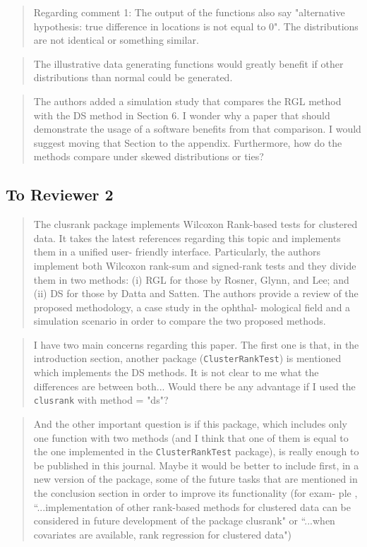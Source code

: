 \documentclass[12pt]{article}
\newenvironment{comment}%
{\begin{quotation}\noindent\small\it\ignorespaces%
  }{\end{quotation}}
\begin{document}
\begin{comment}
Regarding comment 1: The output of the functions also say "alternative
hypothesis: true difference in locations is not equal to 0". The distributions are
not identical or something similar.
\end{comment}

\begin{comment}
The illustrative data generating functions would greatly benefit if other
distributions than normal could be generated.
\end{comment}

\begin{comment}
The authors added a simulation study that compares the RGL method with the
DS method in Section 6. I wonder why a paper that should demonstrate the
usage of a software benefits from that comparison. I would suggest moving
that Section to the appendix. Furthermore, how do the methods compare
under skewed distributions or ties?
\end{comment}


\subsection*{To Reviewer 2}

\begin{comment}
The clusrank package implements Wilcoxon Rank-based tests for clustered
data. It takes the latest references regarding this topic and implements
them in a unified user- friendly interface. Particularly, the authors
implement both Wilcoxon rank-sum and signed-rank tests and they divide
them in two methods: (i) RGL for those by Rosner, Glynn, and Lee; and (ii)
DS for those by Datta and Satten.  The authors provide a review of the
proposed methodology, a case study in the ophthal- mological field and a
simulation scenario in order to compare the two proposed methods.
\end{comment}

\begin{comment}
I have two main concerns regarding this paper. The first one is that, in
the introduction section, another package (\texttt{ClusterRankTest}) is
mentioned which implements the DS methods. It is not clear to me what the
differences are between both... Would there be any advantage if I used the
\texttt{clusrank} with method = "ds"?
\end{comment}

\begin{comment}
And the other important question is if this package, which includes only one function
with two methods (and I think that one of them is equal to the one implemented in the
\texttt{ClusterRankTest} package), is really enough to be published in this journal. Maybe it
would be better to include first, in a new version of the package, some of the future tasks
that are mentioned in the conclusion section in order to improve its functionality (for exam-
ple , ``...implementation of other rank-based methods for clustered data can be considered
in future development of the package clusrank" or ``...when covariates are available, rank
regression for clustered data")
\end{comment}
\end{document}
